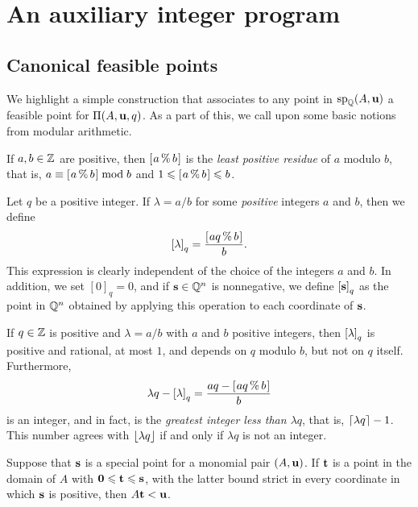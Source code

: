 \documentclass[11pt]{amsart}
\begin{document}
\newpage
\section{An auxiliary integer program}

\subsection{Canonical feasible points}

We highlight a simple construction that associates to any point in $\operatorname{sp}_{\mathbb{Q}}(A, \mathbf{u})$ a feasible point for $\Pi(A, \mathbf{u}, q)$.
As a part of this, we call upon some basic notions from modular arithmetic.

\begin{definition}
   If $a, b \in \mathbb{Z}$ are positive, then $[ \hspace{.01in} a \, \% \, b \hspace{.01in} ]$ is the \emph{least positive residue} of $a$ modulo $b$, that is, $a \equiv [ \hspace{.01in} a \, \% \, b \hspace{.01in} ] \bmod b$ and $1 \leqslant [ \hspace{.01in} a \, \% \, b \hspace{.01in} ] \leqslant b$.
\end{definition}

\begin{definition}
   \label{tail: D}
   Let $q$ be a positive integer.
   If $\lambda = a/b$ for some \emph{positive} integers $a$ and $b$, then we define
   \[ \left[ \lambda \right]_q = \frac{ [ \hspace{.01in} aq \, \% \, b \hspace{.01in} ]}{b}. \]
   This expression is clearly independent of the choice of the integers $a$ and $b$.
   In addition, we set  $[0]_q = 0$, and if $\mathbf{s} \in \mathbb{Q}^n$ is nonnegative, we define $\left[ \mathbf{s} \right]_q$ as the point in $\mathbb{Q}^n$ obtained by applying this operation to each coordinate of $\mathbf{s}$.
\end{definition}

\begin{remark}
   \label{tail-basics: R}
   If $q \in \mathbb{Z}$ is positive and $\lambda = a/b$ with $a$ and $b$ positive integers, then $\left[ \lambda \right]_q$ is positive and rational, at most $1$,  and depends on  $q$ modulo $b$, but not on $q$ itself.
   Furthermore,
   \[ \lambda q - \left[ \lambda \right]_q = \frac{aq-[ \hspace{.01in} aq \, \% \, b \hspace{.01in} ]}{b} \]
   is an integer, and in fact, is the \emph{greatest integer less than $\lambda q$}, that is, $\left\lceil \lambda q \right\rceil - 1$.
   This number agrees with $\left\lfloor  \lambda q \right\rfloor$ if and only if $\lambda q$ is not an integer.
\end{remark}

\begin{lemma}
   \label{less than u: L}
   Suppose that $\mathbf{s}$ is a special point for a monomial pair $(A, \mathbf{u})$.
   If $\mathbf{t}$ is a point in the domain of $A$ with $\mathbf{0} \leqslant \mathbf{t} \leqslant \mathbf{s}$, with the latter bound strict in every coordinate in which $\mathbf{s}$ is positive, then $A \mathbf{t} < \mathbf{u}$.
\end{lemma}
\end{document}
